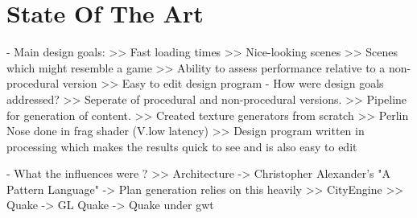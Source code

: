 \chapter{State Of The Art}
 - Main design goals:   
    >> Fast loading times
    >> Nice-looking scenes
    >> Scenes which might resemble a game
    >> Ability to assess performance relative to a non-procedural version
    >> Easy to edit design program
 - How were design goals addressed?
    >> Seperate of procedural and non-procedural versions.
    >> Pipeline for generation of content.
    >> Created texture generators from scratch
    >> Perlin Nose done in frag shader (V.low latency)
    >> Design program written in processing which makes the results quick to see and is also easy to edit

 - What the influences were ?
    >> Architecture
        -> Christopher Alexander's "A Pattern Language"
        -> Plan generation relies on this heavily
    >> CityEngine
    >> Quake
        -> GL Quake
        -> Quake under gwt
